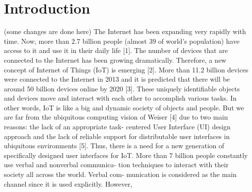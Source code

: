 \documentclass[runningheads,a4paper]{llncs}
\begin{document}
\section{Introduction}
(some changes are done here)
The Internet has been expanding very rapidly with time. Now, more than 2.7 billion people (almost 39 of world’s population) have access to it and use it in their daily life [1]. The number of devices that are connected to the Internet has been growing dramatically. Therefore, a new concept of Internet of Things (IoT) is emerging [2]. More than 11.2 billion devices were connected to the Internet in 2013 and it is predicted that there will be around 50 billion devices online by 2020 [3]. These uniquely identifiable objects and devices move and interact with each other to accomplish various tasks. In other words, IoT is like a big and dynamic society of objects and people. But we are far from the ubiquitous computing vision of Weiser [4] due to two main reasons: the lack of an appropriate task- centered User Interface (UI) design approach and the lack of reliable support for distributable user interfaces in ubiquitous environments [5]. Thus, there is a need for a new generation of specifically designed user interfaces for IoT.
\newline
More than 7 billion people constantly use verbal and nonverbal communica- tion techniques to interact with their society all across the world. Verbal com- munication is considered as the main channel since it is used explicitly. However, 
\newpage
\end{document}
